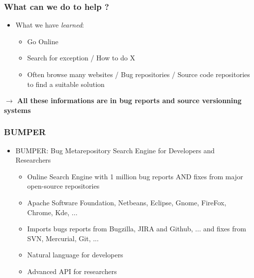 \documentclass{beamer}
\begin{document}
\begin{frame}


\frametitle{What can we do to help ?}

\begin{itemize}
\item What we have \textit{learned}:
\begin{itemize}
\item Go Online
\item Search for exception / How to do X
\item Often browse many websites / Bug repositories / Source code repositories to find a suitable solution
\end{itemize}
\end{itemize}
\vspace{0.3cm}
 \textbf{$\rightarrow$ All these informations are in bug reports and source versionning systems}


\end{frame}

\begin{frame}

\frametitle{BUMPER}
\begin{itemize}
\item BUMPER: Bug Metarepository Search Engine for Developers and Researchers
\begin{itemize}
\item Online Search Engine with 1 million bug reports AND fixes from major open-source repositories
\item Apache Software Foundation, Netbeans, Eclipse, Gnome, FireFox, Chrome, Kde, ...
\item Imports bugs reports from Bugzilla, JIRA and Github, ... and fixes from SVN, Mercurial, Git, ...
\item Natural language for developers
\item Advanced API for researchers
\end{itemize}

\end{itemize}



\end{frame}
\end{document}
